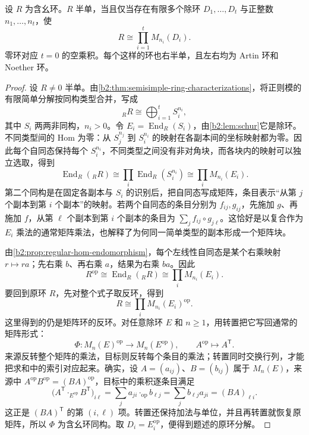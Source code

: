 \begin{theorem}\label{b2:thm:artin-wedderburn}
	设 \(R\) 为含幺环。\(R\) 半单，当且仅当存在有限多个除环 \(D_1,\ldots,D_t\) 与正整数 \(n_1,\ldots,n_t\)，使
	\begin{equation}\label{b2:eq:artin-wedderburn}
		R\cong\prod_{i=1}^tM_{n_i}(D_i).
	\end{equation}
	零环对应 \(t=0\) 的空乘积。每个这样的环也右半单，且左右均为 Artin 环和 Noether 环。
\end{theorem}
\begin{proof}
	设 \(R\ne0\) 半单。由\cref{b2:thm:semisimple-ring-characterizations}，将正则模的有限简单分解按同构类型合并，写成
	\[
		{}_RR\cong\bigoplus_{i=1}^t S_i^{n_i},
	\]
	其中 \(S_i\) 两两非同构，\(n_i>0\)。令 \(E_i=\operatorname{End}_R(S_i)\)，由\cref{b2:lem:schur}它是除环。不同类型间的 Hom 为零：从 \(S_j^{n_j}\) 到 \(S_i^{n_i}\) 的映射在各副本间的坐标映射都为零。因此每个自同态保持每个 \(S_i^{n_i}\)，不同类型之间没有非对角块，而各块内的映射可以独立选取，得到
	\[
		\operatorname{End}_R({}_RR) \cong\prod_i\operatorname{End}_R(S_i^{n_i}) \cong\prod_iM_{n_i}(E_i).
	\]
	第二个同构是在固定各副本与 \(S_i\) 的识别后，把自同态写成矩阵，条目表示“从第 \(j\) 个副本到第 \(i\) 个副本”的映射。若两个自同态的条目分别为 \(f_{ij},g_{ij}\)，先施加 \(g\)、再施加 \(f\)，从第 \(\ell\) 个副本到第 \(i\) 个副本的条目为 \(\sum_jf_{ij}\circ g_{j\ell}\)。这恰好是以复合作为 \(E_i\) 乘法的通常矩阵乘法，也解释了为何同一简单类型的副本形成一个矩阵块。

	由\cref{b2:prop:regular-hom-endomorphism}，每个左线性自同态是某个右乘映射 \(r\mapsto ra\)；先右乘 \(b\)、再右乘 \(a\)，结果为右乘 \(ba\)。因此
	\[
		R^{\mathrm{op}}\cong\operatorname{End}_R({}_RR) \cong\prod_iM_{n_i}(E_i).
	\]
	要回到原环 \(R\)，先对整个式子取反环，得到
	\[
		R\cong\prod_iM_{n_i}(E_i)^{\mathrm{op}}.
	\]
	这里得到的仍是矩阵环的反环。对任意除环 \(E\) 和 \(n\ge1\)，用转置把它写回通常的矩阵形式：
	\[
		\Phi:M_n(E)^{\mathrm{op}}\longrightarrow M_n(E^{\mathrm{op}}), \qquad A^{\mathrm{op}}\longmapsto A^{\mathsf T}.
	\]
	来源反转整个矩阵的乘法，目标则反转每个条目的乘法；转置同时交换行列，才能把求和中的索引对应起来。确实，设 \(A=(a_{ij})\)、\(B=(b_{ij})\) 属于 \(M_n(E)\)，来源中 \(A^{\mathrm{op}}B^{\mathrm{op}}=(BA)^{\mathrm{op}}\)，目标中的乘积逐条目满足
	\[
		\bigl(A^{\mathsf T}\cdot_{E^{\mathrm{op}}}B^{\mathsf T}\bigr)_{i\ell} =\sum_j a_{ji}\cdot_{\mathrm{op}}b_{\ell j} =\sum_j b_{\ell j}a_{ji} =(BA)_{\ell i}.
	\]
	这正是 \((BA)^{\mathsf T}\) 的第 \((i,\ell)\) 项。转置还保持加法与单位，并且再转置就恢复原矩阵，所以 \(\Phi\) 为含幺环同构。取 \(D_i=E_i^{\mathrm{op}}\)，便得到题述的原环分解。


\end{proof}
